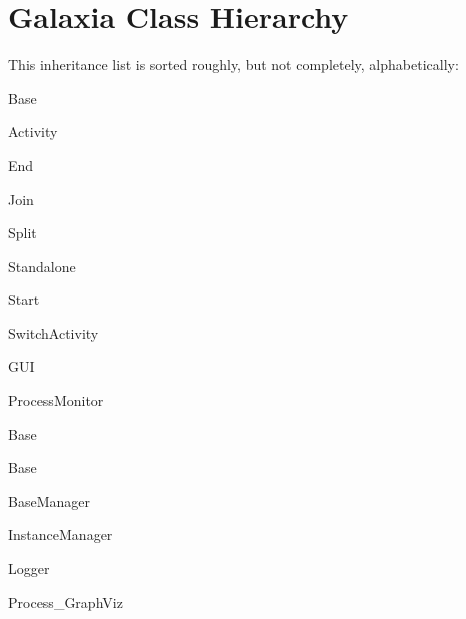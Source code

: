 \section{Galaxia Class Hierarchy}
This inheritance list is sorted roughly, but not completely, alphabetically:\begin{CompactList}
\item {}
\begin{CompactList}
\item Base\begin{CompactList}
\item {}
\begin{CompactList}
\item Activity\item End\item Join\item Split\item Standalone\item Start\item Switch\-Activity\end{CompactList}
\item GUI\item {}
\item {}
\item Process\-Monitor\item {}
\item {}
\end{CompactList}
\item Base\item Base\item Base\-Manager\begin{CompactList}
\item {}
\item Instance\-Manager\item {}
\item {}
\end{CompactList}
\end{CompactList}
\item {}
\begin{CompactList}
\item Logger\end{CompactList}
\item Process\_\-Graph\-Viz\end{CompactList}
